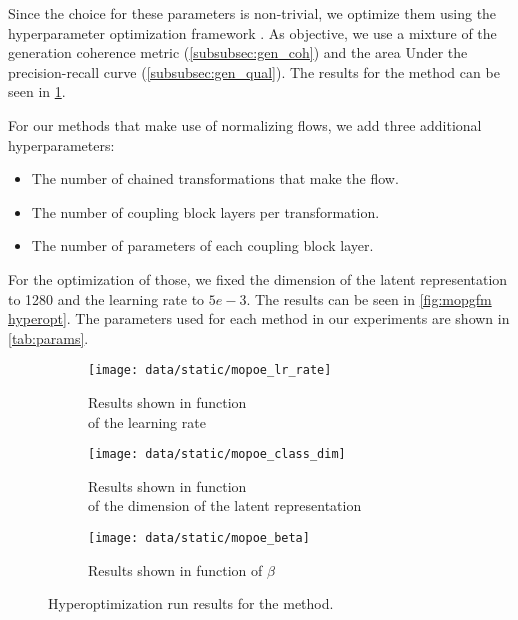 Since the choice for these parameters is non-trivial, we optimize them using the hyperparameter optimization framework  \citep{akiba_optuna_2019}.
As objective, we use a mixture of the generation coherence metric (\cref{subsubsec:gen_coh}) and the area Under the precision-recall curve (\cref{subsubsec:gen_qual}).
The results for the  method can be seen in \cref{fig:mopoe hyperopt}.

For our methods that make use of normalizing flows, we add three additional hyperparameters:
\begin{itemize}
    \item The number of chained transformations that make the flow.
    \item The number of coupling block layers per transformation.
    \item The number of parameters of each coupling block layer.
\end{itemize}

For the optimization of those, we fixed the dimension of the latent representation to 1280 and the learning rate to $5e-3$.
The results can be seen in \cref{fig:mopgfm hyperopt}.
The parameters used for each method in our experiments are shown in \cref{tab:params}.



\begin{figure}
    \centering
    \begin{subfigure}[b]{0.49\textwidth}
        \centering
        \texttt{[image: data/static/mopoe\_lr\_rate]}
        \caption{Results shown in function\\ of the learning rate}
    \end{subfigure}
    \hfill
    \begin{subfigure}[b]{0.49\textwidth}
        \centering
        \texttt{[image: data/static/mopoe\_class\_dim]}
        \caption{Results shown in function\\ of the dimension of the latent representation}
    \end{subfigure}
    \hfill
    \begin{subfigure}[b]{0.5\textwidth}
        \centering
        \texttt{[image: data/static/mopoe\_beta]}
        \caption{Results shown in function of $\beta$}
    \end{subfigure}
    \caption{Hyperoptimization run results for the  method.}
    \label{fig:mopoe hyperopt}
\end{figure}

